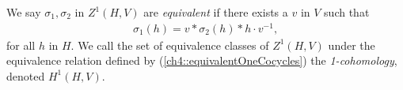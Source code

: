 

We say $\sigma_1, \sigma_2$ in $Z^1(H, V)$ are \emph{equivalent} if there exists a $v$ in $V$ such that
\begin{eqnarray}\label{ch4::equivalentOneCocycles}
	\sigma_1(h) = v * \sigma_2(h) * h\cdot v^{-1},
\end{eqnarray}
for all $h$ in $H$. We call the set of equivalence classes of $Z^1(H, V)$ under the equivalence relation defined by (\ref{ch4::equivalentOneCocycles}) the \emph{1-cohomology}, denoted $H^1(H, V)$.

